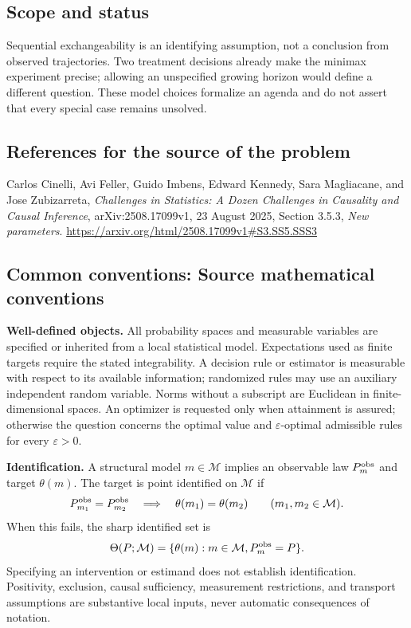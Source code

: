 \documentclass[11pt,a4paper]{article}
\begin{document}
\subsection*{Scope and status}
Sequential exchangeability is an identifying assumption, not a conclusion from observed trajectories. Two treatment decisions already make the minimax experiment precise; allowing an unspecified growing horizon would define a different question. These model choices formalize an agenda and do not assert that every special case remains unsolved.
\subsection*{References for the source of the problem}
Carlos Cinelli, Avi Feller, Guido Imbens, Edward Kennedy, Sara Magliacane, and Jose Zubizarreta, \emph{Challenges in Statistics: A Dozen Challenges in Causality and Causal Inference}, arXiv:2508.17099v1, 23 August 2025, Section 3.5.3, \emph{New parameters}.
\url{https://arxiv.org/html/2508.17099v1#S3.SS5.SSS3}

\subsection*{Common conventions: Source mathematical conventions}

\textbf{Well-defined objects.}
All probability spaces and measurable variables are specified or inherited
from a local statistical model. Expectations used as finite targets require
the stated integrability. A decision rule or estimator is measurable with
respect to its available information; randomized rules may use an auxiliary
independent random variable. Norms without a subscript are Euclidean in
finite-dimensional spaces. An optimizer is requested only when attainment
is assured; otherwise the question concerns the optimal value and
$\varepsilon$-optimal admissible rules for every $\varepsilon>0$.

\textbf{Identification.}
A structural model $m\in\mathcal M$ implies an observable law
$P_m^{\rm obs}$ and target $\theta(m)$. The target is point identified on
$\mathcal M$ if
\[
 P_{m_1}^{\rm obs}=P_{m_2}^{\rm obs}
 \quad\Longrightarrow\quad\theta(m_1)=\theta(m_2)
 \qquad(m_1,m_2\in\mathcal M).
\]
When this fails, the sharp identified set is
\[
 \Theta(P;\mathcal M)=\{\theta(m):m\in\mathcal M,
                                  P_m^{\rm obs}=P\}.
\]
Specifying an intervention or estimand does not establish identification.
Positivity, exclusion, causal sufficiency, measurement restrictions, and
transport assumptions are substantive local inputs, never automatic
consequences of notation.
\end{document}
